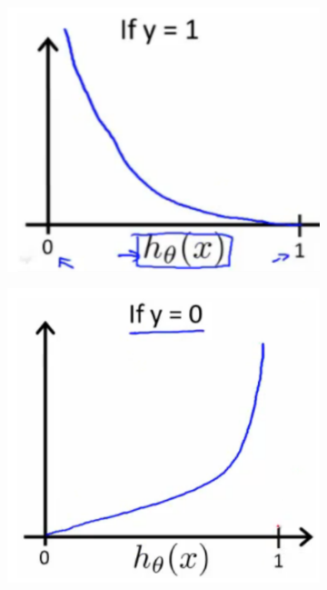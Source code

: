 \documentclass{article}
\begin{document}
        \begin{figure}[hbt!]
            \centering
            \begin{subfigure}[b]{.45\linewidth}
                \includegraphics[scale=0.6]{Resources/Log_Model}
            \end{subfigure}
            \begin{subfigure}[b]{.45\linewidth}
                \includegraphics[scale=0.6]{Resources/Log_Model2}
            \end{subfigure}
        \end{figure}
\end{document}
